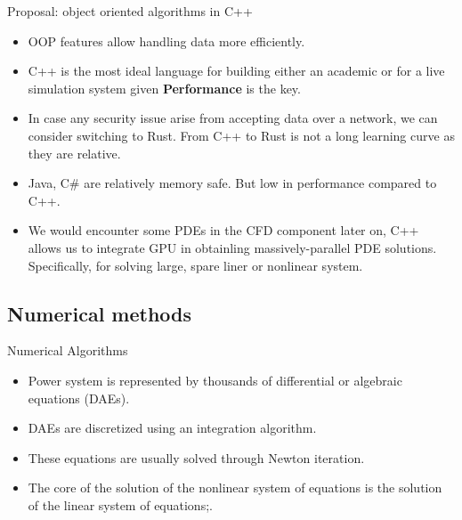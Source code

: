 \documentclass[xcolor=dvipsnames]{beamer}
\begin{document}





\begin{frame}{Proposal: object oriented algorithms in C++}
\begin{itemize}
	\item OOP features allow handling data more efficiently. 
	\item C++ is the most ideal language for building either an academic or for a live simulation system given \textbf{Performance} is the key. 
	\item  In case any security issue arise from accepting data over a network, we can consider switching to Rust. From C++ to Rust is not a long learning curve as they are relative.
	\item Java, C\# are relatively memory safe. But low in performance compared to C++.
	\item We would encounter some PDEs in the CFD component later on, C++ allows us to integrate GPU in obtainling massively-parallel PDE solutions. Specifically, for solving large, spare liner or nonlinear system.
\end{itemize}

\end{frame}
\subsection{Numerical methods}
\begin{frame}{Numerical Algorithms}
	\begin{itemize}
		\item Power system is represented by thousands of differential or algebraic equations (DAEs).
		\item DAEs are discretized using an integration algorithm.
		\item These equations are usually solved through Newton iteration.
		\item The core of the solution of the nonlinear system of equations is the solution of the linear system of equations;. 
	\end{itemize}
\end{frame}
\end{document}
